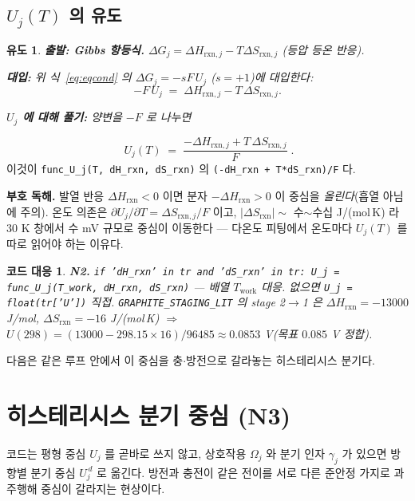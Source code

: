 \documentclass[11pt,a4paper]{article}
\newtheorem*{codebox}{코드 대응}
\newtheorem*{derivebox}{유도}
\newcommand{\rxn}{\mathrm{rxn}}
\newcommand{\work}{\mathrm{work}}
\newcommand{\code}[1]{\texttt{#1}}
\begin{document}
\subsection{$U_j(T)$ 의 유도}
\begin{derivebox}
\textbf{출발: Gibbs 항등식.} $\Delta G_j=\Delta H_{\rxn,j}-T\Delta S_{\rxn,j}$ (등압 등온 반응).

\textbf{대입: } 위 식~\eqref{eq:eqcond} 의 $\Delta G_j=-sF\,U_j$ ($s=+1$)에 대입한다:
\begin{equation*}
-F\,U_j\;=\;\Delta H_{\rxn,j}-T\,\Delta S_{\rxn,j}.
\end{equation*}

\textbf{$U_j$ 에 대해 풀기:} 양변을 $-F$ 로 나누면
\end{derivebox}
\begin{equation}
\boxed{\;U_j(T)\;=\;\frac{-\Delta H_{\rxn,j}+T\,\Delta S_{\rxn,j}}{F}\;.}
\label{eq:Uj}
\end{equation}
이것이 \code{func\_U\_j(T, dH\_rxn, dS\_rxn)} 의 \code{(-dH\_rxn + T*dS\_rxn)/F} 다.

\textbf{부호 독해.} 발열 반응 $\Delta H_\rxn<0$ 이면 분자 $-\Delta H_\rxn>0$ 이 중심을 \emph{올린다}(흡열 아님에 주의).
온도 의존은 $\partial U_j/\partial T=\Delta S_{\rxn,j}/F$ 이고, $|\Delta S_\rxn|\sim$ 수$\sim$수십 J/(mol\,K) 라
$30$ K 창에서 수 mV 규모로 중심이 이동한다 — 다온도 피팅에서 온도마다 $U_j(T)$ 를 따로 읽어야 하는 이유다.

\begin{codebox}
\textbf{N2.} \code{if 'dH\_rxn' in tr and 'dS\_rxn' in tr: U\_j = func\_U\_j(T\_work, dH\_rxn, dS\_rxn)}
— 배열 $T_\work$ 대응. 없으면 \code{U\_j = float(tr['U'])} 직접. \code{GRAPHITE\_STAGING\_LIT} 의 stage 2$\to$1 은
$\Delta H_\rxn=-13000$ J/mol, $\Delta S_\rxn=-16$ J/(mol\,K) $\Rightarrow$ $U(298)=(13000-298.15\times16)/96485
\approx0.0853$ V(목표 $0.085$ V 정합).
\end{codebox}

다음은 같은 루프 안에서 이 중심을 충$\cdot$방전으로 갈라놓는 히스테리시스 분기다.

\section{히스테리시스 분기 중심 (N3)}\label{sec:hys}
코드는 평형 중심 $U_j$ 를 곧바로 쓰지 않고, 상호작용 $\Omega_j$ 와 분기 인자 $\gamma_j$ 가 있으면 방향별 분기 중심
$U_j^{\,d}$ 로 옮긴다. 방전과 충전이 같은 전이를 서로 다른 준안정 가지로 과주행해 중심이 갈라지는 현상이다.
\end{document}
